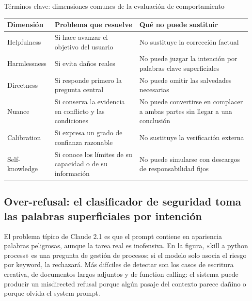 \documentclass[a4paper]{article}
\begin{document}
\begin{knowledgebox}{Términos clave: dimensiones comunes de la evaluación de comportamiento}
\begin{tabularx}{\textwidth}{L{0.18\textwidth} X X}
\toprule
Dimensión & Problema que resuelve & Qué no puede sustituir \\
\midrule
Helpfulness & Si hace avanzar el objetivo del usuario & No sustituye la corrección factual \\
Harmlessness & Si evita daños reales & No puede juzgar la intención por palabras clave superficiales \\
Directness & Si responde primero la pregunta central & No puede omitir las salvedades necesarias \\
Nuance & Si conserva la evidencia en conflicto y las condiciones & No puede convertirse en complacer a ambas partes sin llegar a una conclusión \\
Calibration & Si expresa un grado de confianza razonable & No sustituye la verificación externa \\
Self-knowledge & Si conoce los límites de su capacidad o de su información & No puede simularse con descargos de responsabilidad fijos \\
\bottomrule
\end{tabularx}
\end{knowledgebox}


\subsection{Over-refusal: el clasificador de seguridad toma las palabras superficiales por intención}

El problema típico de Claude 2.1 es que el prompt contiene en apariencia palabras peligrosas, aunque la tarea real es inofensiva. En la figura, «kill a python process» es una pregunta de gestión de procesos; si el modelo solo asocia el riesgo por keyword, la rechazará. Más difíciles de detectar son los casos de escritura creativa, de documentos largos adjuntos y de function calling: el sistema puede producir un misdirected refusal porque algún pasaje del contexto parece dañino o porque olvida el system prompt.
\end{document}
